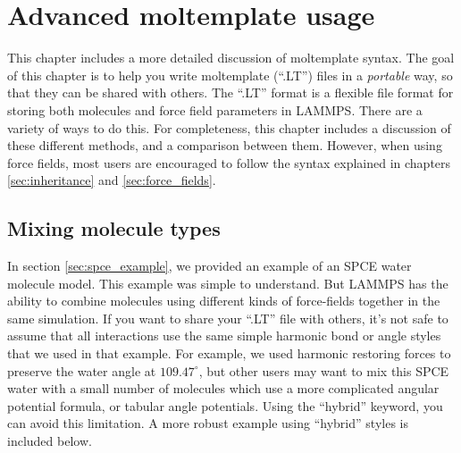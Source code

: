 \documentclass[11pt]{article}
\begin{document}
\section{Advanced moltemplate usage}
\label{sec:advanced_usage}
This chapter includes a more detailed discussion of moltemplate syntax.
The goal of this chapter is to help you write moltemplate (``.LT'') files
in a \textit{portable} way, so that they can be shared with others.
The ``.LT'' format is a flexible file format for storing both
molecules and force field parameters in LAMMPS.
There are a variety of ways to do this.
For completeness, this chapter includes a discussion of these
different methods, and a comparison between them.
However, when using force fields, most users are encouraged to
follow the syntax explained in chapters
\ref{sec:inheritance} and \ref{sec:force_fields}.



\subsection{Mixing molecule types}
In section \ref{sec:spce_example}, 
we provided an example of an SPCE water molecule model.
This example was simple to understand.
But LAMMPS has the ability to combine molecules using different
kinds of force-fields together in the same simulation.
If you want to share your ``.LT'' file with others, it's not safe to assume
that all interactions use the same simple harmonic bond or angle styles
that we used in that example.
For example, we used harmonic restoring forces to preserve the water angle 
at $109.47^\circ$, but other users may want to mix this SPCE water with a small 
number of molecules which use a more complicated angular potential formula,
or tabular angle potentials.
Using the ``hybrid'' keyword, you can avoid this limitation. 
A more robust example using ``hybrid'' styles is included below.
\end{document}
